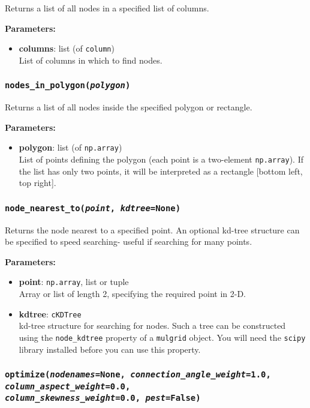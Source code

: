 Returns a list of all nodes in a specified list of columns.

\textbf{Parameters:}
\begin{itemize}
\item \textbf{columns}: list (of \texttt{column})\\
  List of columns in which to find nodes.
\end{itemize}

\subsubsection{\texttt{nodes\_in\_polygon(\emph{polygon})}}
\label{sec:nodes_in_polygon}

Returns a list of all nodes inside the specified polygon or rectangle.

\textbf{Parameters:}
\begin{itemize}
\item \textbf{polygon}: list (of \texttt{np.array})\\
  List of points defining the polygon (each point is a two-element \texttt{np.array}).  If the list has only two points, it will be interpreted as a rectangle [bottom left, top right].
\end{itemize}

\subsubsection{\texttt{node\_nearest\_to(\emph{point}, \emph{kdtree}=None)}}
\label{sec:node_nearest_to}

Returns the node nearest to a specified point.  An optional kd-tree structure can be specified to speed searching- useful if searching for many points.

\textbf{Parameters:}
\begin{itemize}
\item \textbf{point}:  \texttt{np.array}, list or tuple\\
  Array or list of length 2, specifying the required point in 2-D.
\item \textbf{kdtree}:  \texttt{cKDTree}\\
  kd-tree structure for searching for nodes.  Such a tree can be constructed using the \texttt{node\_kdtree} property of a \texttt{mulgrid} object.  You will need the \texttt{scipy} library installed before you can use this property.
\end{itemize}

\subsubsection{\texttt{optimize(\emph{nodenames}=None, \emph{connection\_angle\_weight}=1.0, \emph{column\_aspect\_weight}=0.0,\\
    \emph{column\_skewness\_weight}=0.0, \emph{pest}=False)}}
\label{sec:optimize}

